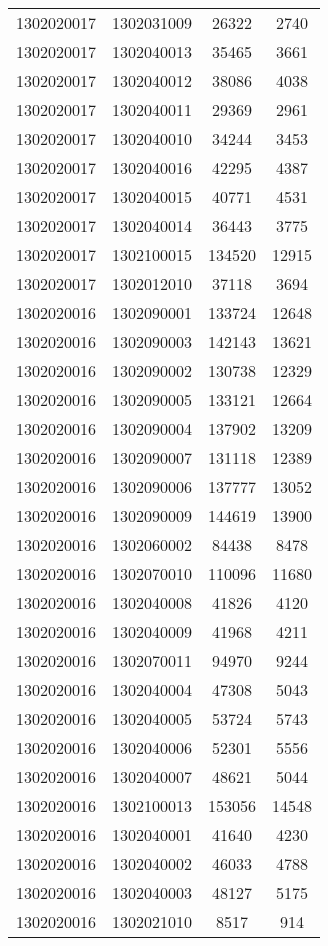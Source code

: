 \begin{longtable}{llcc}
1302020017 & 1302031009 & 26322 & 2740\\
1302020017 & 1302040013 & 35465 & 3661\\
1302020017 & 1302040012 & 38086 & 4038\\
1302020017 & 1302040011 & 29369 & 2961\\
1302020017 & 1302040010 & 34244 & 3453\\
1302020017 & 1302040016 & 42295 & 4387\\
1302020017 & 1302040015 & 40771 & 4531\\
1302020017 & 1302040014 & 36443 & 3775\\
1302020017 & 1302100015 & 134520 & 12915\\
1302020017 & 1302012010 & 37118 & 3694\\
1302020016 & 1302090001 & 133724 & 12648\\
1302020016 & 1302090003 & 142143 & 13621\\
1302020016 & 1302090002 & 130738 & 12329\\
1302020016 & 1302090005 & 133121 & 12664\\
1302020016 & 1302090004 & 137902 & 13209\\
1302020016 & 1302090007 & 131118 & 12389\\
1302020016 & 1302090006 & 137777 & 13052\\
1302020016 & 1302090009 & 144619 & 13900\\
1302020016 & 1302060002 & 84438 & 8478\\
1302020016 & 1302070010 & 110096 & 11680\\
1302020016 & 1302040008 & 41826 & 4120\\
1302020016 & 1302040009 & 41968 & 4211\\
1302020016 & 1302070011 & 94970 & 9244\\
1302020016 & 1302040004 & 47308 & 5043\\
1302020016 & 1302040005 & 53724 & 5743\\
1302020016 & 1302040006 & 52301 & 5556\\
1302020016 & 1302040007 & 48621 & 5044\\
1302020016 & 1302100013 & 153056 & 14548\\
1302020016 & 1302040001 & 41640 & 4230\\
1302020016 & 1302040002 & 46033 & 4788\\
1302020016 & 1302040003 & 48127 & 5175\\
1302020016 & 1302021010 & 8517 & 914\\

\end{longtable}

